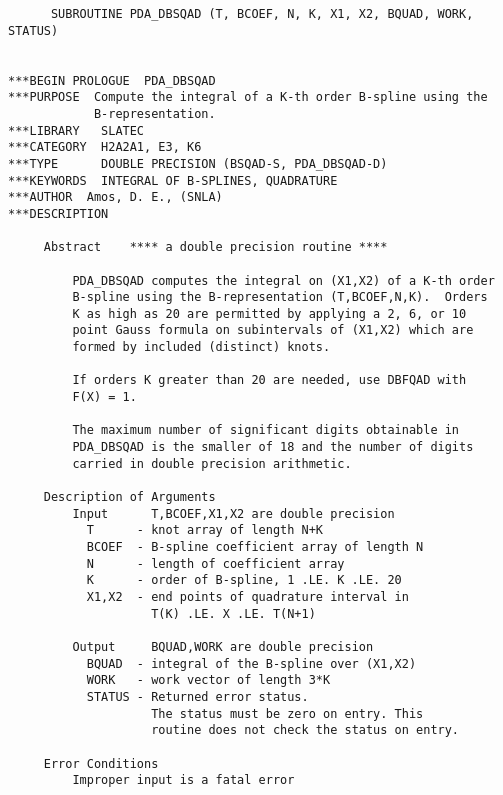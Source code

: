 

\begin{verbatim}
      SUBROUTINE PDA_DBSQAD (T, BCOEF, N, K, X1, X2, BQUAD, WORK, STATUS)


***BEGIN PROLOGUE  PDA_DBSQAD
***PURPOSE  Compute the integral of a K-th order B-spline using the
            B-representation.
***LIBRARY   SLATEC
***CATEGORY  H2A2A1, E3, K6
***TYPE      DOUBLE PRECISION (BSQAD-S, PDA_DBSQAD-D)
***KEYWORDS  INTEGRAL OF B-SPLINES, QUADRATURE
***AUTHOR  Amos, D. E., (SNLA)
***DESCRIPTION

     Abstract    **** a double precision routine ****

         PDA_DBSQAD computes the integral on (X1,X2) of a K-th order
         B-spline using the B-representation (T,BCOEF,N,K).  Orders
         K as high as 20 are permitted by applying a 2, 6, or 10
         point Gauss formula on subintervals of (X1,X2) which are
         formed by included (distinct) knots.

         If orders K greater than 20 are needed, use DBFQAD with
         F(X) = 1.

         The maximum number of significant digits obtainable in
         PDA_DBSQAD is the smaller of 18 and the number of digits
         carried in double precision arithmetic.

     Description of Arguments
         Input      T,BCOEF,X1,X2 are double precision
           T      - knot array of length N+K
           BCOEF  - B-spline coefficient array of length N
           N      - length of coefficient array
           K      - order of B-spline, 1 .LE. K .LE. 20
           X1,X2  - end points of quadrature interval in
                    T(K) .LE. X .LE. T(N+1)

         Output     BQUAD,WORK are double precision
           BQUAD  - integral of the B-spline over (X1,X2)
           WORK   - work vector of length 3*K
           STATUS - Returned error status.
                    The status must be zero on entry. This
                    routine does not check the status on entry.

     Error Conditions
         Improper input is a fatal error


\end{verbatim}

